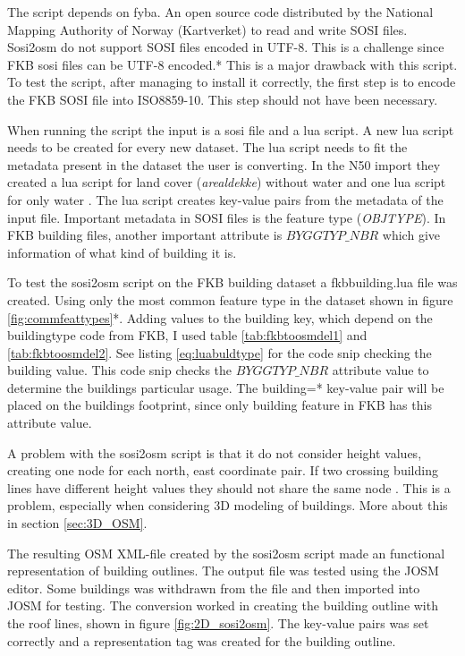 The script depends on fyba. An open source code distributed by the National Mapping Authority of Norway (Kartverket) to read and write SOSI files. Sosi2osm do not support SOSI files encoded in UTF-8. This is a challenge since FKB sosi files can be UTF-8 encoded.*%
 This is a major drawback with this script. To test the script, after managing to install it correctly, the first step is to encode the FKB SOSI file into ISO8859-10. This step should not have been necessary.  %

When running the script the input is a sosi file and a lua script. A new lua script needs to be created for every new dataset. The lua script needs to fit the metadata present in the dataset the user is converting. In the N50 import they created a lua script for land cover (\textit{arealdekke}) without water and one lua script for only water \cite{OpenStreetMapn}. The lua script creates key-value pairs from the metadata of the input file. Important metadata in SOSI files is the feature type (\textit{OBJTYPE}). In FKB building files, another important attribute is $BYGGTYP\_NBR$ which give information of what kind of building it is. 

To test the sosi2osm script on the FKB building dataset a fkbbuilding.lua file was created. Using only the most common feature type in the dataset shown in figure \ref{fig:commfeattypes}*.%
  Adding values to the building key, which depend on the buildingtype code from FKB, I used table \ref{tab:fkbtoosmdel1} and \ref{tab:fkbtoosmdel2}. See listing \ref{eq:luabuldtype} for the code snip checking the building value. This code snip checks the $BYGGTYP\_NBR$ attribute value to determine the buildings particular usage. The building=* key-value pair will be placed on the buildings footprint, since only building feature in FKB has this attribute value. 

A problem with the sosi2osm script is that it do not consider height values, creating one node for each north, east coordinate pair. If two crossing building lines have different height values they should not share the same node \cite{OpenStreetMap2015}. This is a problem, especially when considering 3D modeling of buildings. More about this in section \ref{sec:3D_OSM}.

The resulting OSM XML-file created by the sosi2osm script made an functional representation of building outlines. The output file was tested using the JOSM editor. Some buildings was withdrawn from the file and then imported into JOSM for testing. The conversion worked in creating the building outline with the roof lines, shown in figure \ref{fig:2D_sosi2osm}. The key-value pairs was set correctly and a representation tag was created for the building outline. 

